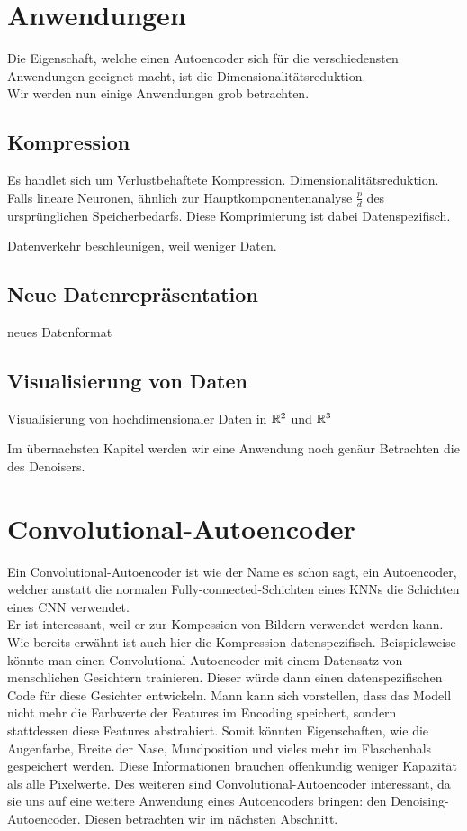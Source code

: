 \section{Anwendungen}
Die Eigenschaft, welche einen Autoencoder sich für die verschiedensten
Anwendungen geeignet macht, ist die Dimensionalitätsreduktion. \\
Wir werden nun einige Anwendungen grob betrachten.

\subsection{Kompression}
Es handlet sich um Verlustbehaftete Kompression.
Dimensionalitätsreduktion. Falls lineare Neuronen, ähnlich zur Hauptkomponentenanalyse
$\frac{p}{d}$ des ursprünglichen Speicherbedarfs. Diese Komprimierung ist dabei Datenspezifisch.

Datenverkehr beschleunigen, weil weniger Daten.

\subsection{Neue Datenrepräsentation}
neues Datenformat

\subsection{Visualisierung von Daten}
Visualisierung von hochdimensionaler Daten in $\mathbb{R}^2$ und $\mathbb{R}^3$


Im übernachsten Kapitel werden wir eine Anwendung noch genäur Betrachten die
des Denoisers.

\section{Convolutional-Autoencoder}
Ein Convolutional-Autoencoder ist wie der Name es schon sagt, ein Autoencoder,
welcher anstatt die normalen Fully-connected-Schichten eines KNNs die Schichten eines CNN verwendet. \\
Er ist interessant, weil er zur Kompession von Bildern verwendet werden kann.
Wie bereits erwähnt ist auch hier die Kompression datenspezifisch.
Beispielsweise könnte man einen Convolutional-Autoencoder mit einem Datensatz
von menschlichen Gesichtern trainieren. Dieser würde dann einen
datenspezifischen Code für diese Gesichter entwickeln. Mann kann sich
vorstellen, dass das Modell nicht mehr die Farbwerte der Features im Encoding
speichert, sondern stattdessen diese Features abstrahiert. Somit könnten
Eigenschaften, wie die Augenfarbe, Breite der Nase, Mundposition und vieles mehr
im Flaschenhals gespeichert werden. Diese Informationen brauchen offenkundig
weniger Kapazität als alle Pixelwerte.
\para{}
Des weiteren sind Convolutional-Autoencoder interessant, da sie uns auf eine
weitere Anwendung eines Autoencoders bringen: den Denoising-Autoencoder.
Diesen betrachten wir im nächsten Abschnitt.

